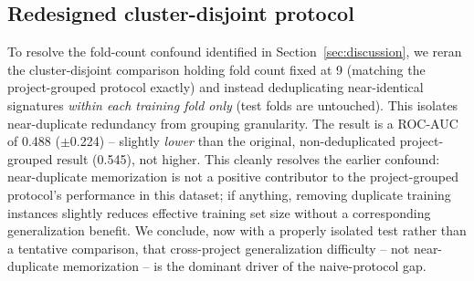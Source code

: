 \documentclass[preprint,12pt]{elsarticle}
\begin{document}
\subsection{Redesigned cluster-disjoint protocol}
\label{sec:redesign}
To resolve the fold-count confound identified in Section~\ref{sec:discussion}, we reran the cluster-disjoint comparison holding fold count fixed at 9 (matching the project-grouped protocol exactly) and instead deduplicating near-identical signatures \emph{within each training fold only} (test folds are untouched). This isolates near-duplicate redundancy from grouping granularity. The result is a ROC-AUC of 0.488 ($\pm$0.224) -- slightly \emph{lower} than the original, non-deduplicated project-grouped result (0.545), not higher. This cleanly resolves the earlier confound: near-duplicate memorization is not a positive contributor to the project-grouped protocol's performance in this dataset; if anything, removing duplicate training instances slightly reduces effective training set size without a corresponding generalization benefit. We conclude, now with a properly isolated test rather than a tentative comparison, that cross-project generalization difficulty -- not near-duplicate memorization -- is the dominant driver of the naive-protocol gap.
\end{document}
